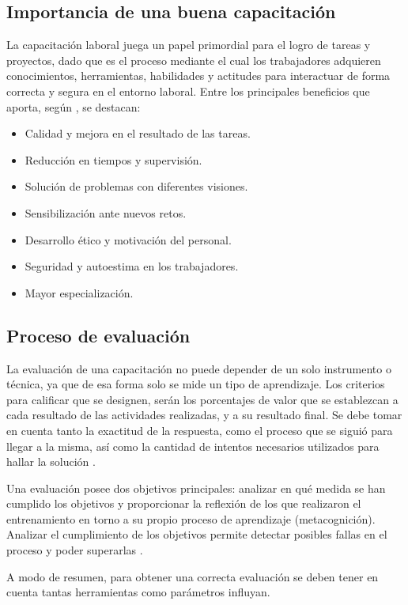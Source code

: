 \subsection{Importancia de una buena capacitación}
La capacitación laboral juega un papel primordial para el logro de tareas y proyectos, dado que es el proceso mediante el cual los trabajadores adquieren conocimientos, herramientas, habilidades y actitudes para interactuar de forma correcta y segura en el entorno laboral. Entre los principales beneficios que aporta, según \cite{SistemasCapAsistidos}, se destacan:

\begin{itemize}
\item Calidad y mejora en el resultado de las tareas.
\item Reducción en tiempos y supervisión.
\item Solución de problemas con diferentes visiones.
\item Sensibilización ante nuevos retos.
\item Desarrollo ético y motivación del personal.
\item Seguridad y autoestima en los trabajadores.
\item Mayor especialización.
\end{itemize}

\subsection{Proceso de evaluación}
La evaluación de una capacitación no puede depender de un solo instrumento o técnica, ya que de esa forma solo se mide un tipo de aprendizaje. Los criterios para calificar que se designen, serán los porcentajes de valor que se establezcan a cada resultado de las actividades realizadas, y a su resultado final. Se debe tomar en cuenta tanto la exactitud de la respuesta, como el proceso que se siguió para llegar a la misma, así como la cantidad de intentos necesarios utilizados para hallar la solución \cite{CapTrabajadores}.

Una evaluación posee dos objetivos principales: analizar en qué medida se han cumplido los objetivos y proporcionar la reflexión de los que realizaron el entrenamiento en torno a su propio proceso de aprendizaje (metacognición). Analizar el cumplimiento de los objetivos permite detectar posibles fallas en el proceso y poder superarlas \cite{EtapasEntrenamiento}.

A modo de resumen, para obtener una correcta evaluación se deben tener en cuenta tantas herramientas como parámetros influyan.

